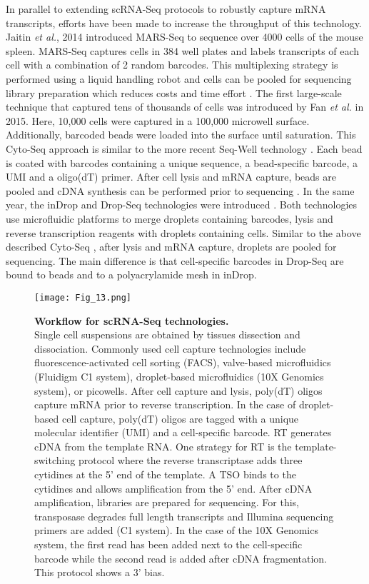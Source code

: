 In parallel to extending scRNA-Seq protocols to robustly capture mRNA transcripts, efforts have been made to increase the throughput of this technology. Jaitin \emph{et al.}, 2014 introduced \gls{MARS-Seq} to sequence over 4000 cells of the mouse spleen. MARS-Seq captures cells in 384 well plates and labels transcripts of each cell with a combination of 2 random barcodes. This multiplexing strategy is performed using a liquid handling robot and cells can be pooled for sequencing library preparation which reduces costs and time effort \citep{Jaitin2014}. The first large-scale technique that captured tens of thousands of cells was introduced by Fan \emph{et al.} in 2015. Here, 10,000 cells were captured in a 100,000 microwell surface. Additionally, barcoded beads were loaded into the surface until saturation. This Cyto-Seq approach is similar to the more recent Seq-Well technology \citep{Gierahn2017}. Each bead is coated with barcodes containing a unique sequence, a bead-specific barcode, a UMI and a oligo(dT) primer. After cell lysis and mRNA capture, beads are pooled and cDNA synthesis can be performed prior to sequencing \citep{Fan2015}. In the same year, the inDrop and Drop-Seq technologies were introduced \citep{Klein2015, Macosko2015}. Both technologies use microfluidic platforms to merge droplets containing barcodes, lysis and reverse transcription reagents with droplets containing cells. Similar to the above described Cyto-Seq \citep{Fan2015}, after lysis and mRNA capture, droplets are pooled for sequencing. The main difference is that cell-specific barcodes in Drop-Seq are bound to beads and to a polyacrylamide mesh in inDrop.  \\ 

\begin{figure}[!h]
\centering
\texttt{[image: Fig\_13.png]}
\caption[Workflow for scRNA-Seq technologies]{\textbf{Workflow for scRNA-Seq technologies.}\\
Single cell suspensions are obtained by tissues dissection and dissociation. Commonly used cell capture technologies include fluorescence-activated cell sorting (FACS), valve-based microfluidics (Fluidigm\textsuperscript{\textregistered{}} C1 system), droplet-based microfluidics (10X Genomics\textsuperscript{\textregistered{}} system), or picowells. After cell capture and lysis, poly(dT) oligos capture mRNA prior to reverse transcription. In the case of droplet-based cell capture, poly(dT) oligos are tagged with a unique molecular identifier (UMI) and a cell-specific barcode. \Gls{RT} generates cDNA from the template RNA. One strategy for RT is the template-switching protocol where the reverse transcriptase adds three cytidines at the 5' end of the template. A \gls{TSO} binds to the cytidines and allows amplification from the 5' end. After cDNA amplification, libraries are prepared for sequencing. For this, transposase degrades full length transcripts and Illumina sequencing primers are added (C1 system). In the case of the 10X Genomics system, the first read has been added next to the cell-specific barcode while the second read is added after cDNA fragmentation. This protocol shows a 3' bias.}
\label{fig0:scRNA-Seq}
\end{figure}

